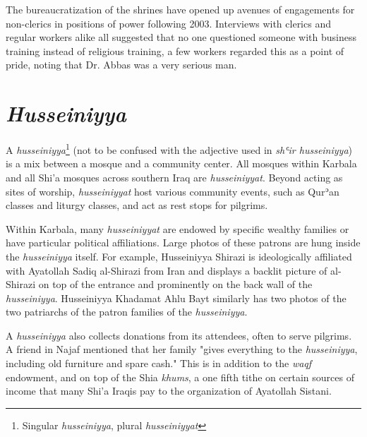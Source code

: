 The bureaucratization of the shrines have opened up avenues of engagements for non-clerics in positions of power following 2003. Interviews with clerics and regular workers alike all suggested that no one questioned someone with business training instead of religious training, a few workers regarded this as a point of pride, noting that Dr. Abbas was a very serious man. 


\section{\emph{Husseiniyya}}
A \emph{husseiniyya}\footnote{Singular \emph{husseiniyya}, plural \emph{husseiniyyat}} (not to be confused with the adjective used in \emph{shʿir husseiniyya}) is a mix between a mosque and a community center. All mosques within Karbala and all Shi'a mosques across southern Iraq are \emph{husseiniyyat}. Beyond acting as sites of worship, \emph{husseiniyyat} host various community events, such as Qurʾan classes and liturgy classes, and act as rest stops for pilgrims.

Within Karbala, many \emph{husseiniyyat} are endowed by specific wealthy families or have particular political affiliations. Large photos of these patrons are hung inside the \emph{husseiniyya} itself. For example, Husseiniyya Shirazi is ideologically affiliated with Ayatollah Sadiq al-Shirazi from Iran and displays a backlit picture of al-Shirazi on top of the entrance and prominently on the back wall of the \emph{husseiniyya}. Husseiniyya Khadamat Ahlu Bayt similarly has two photos of the two patriarchs of the patron families of the \emph{husseiniyya}.

A \emph{husseiniyya} also collects donations from its attendees, often to serve pilgrims. A friend in Najaf mentioned that her family "gives everything to the \emph{husseiniyya}, including old furniture and spare cash." This is in addition to the \emph{waqf} endowment, and on top of the Shia \emph{khums}, a one fifth tithe on certain sources of income that many Shi'a Iraqis pay to the organization of Ayatollah Sistani.


